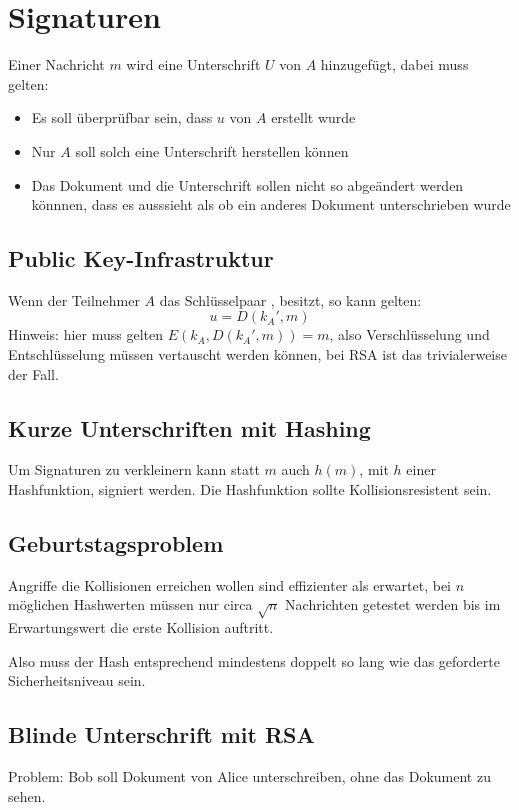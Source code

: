 \chapter{Signaturen}
Einer Nachricht $m$ wird eine Unterschrift $U$ von $A$ hinzugefügt, dabei muss gelten:
\begin{itemize}
    \item
        Es soll überprüfbar sein, dass $u$ von $A$ erstellt wurde
    \item
        Nur $A$ soll solch eine Unterschrift herstellen können
    \item
        Das Dokument und die Unterschrift sollen nicht so abgeändert werden könnnen,
        dass es ausssieht als ob ein anderes Dokument unterschrieben wurde
\end{itemize}

\section{Public Key-Infrastruktur}
Wenn der Teilnehmer $A$ das Schlüsselpaar ,  besitzt, so kann
gelten:
\begin{equation}
    u = D(k_A', m)
\end{equation}
Hinweis: hier muss gelten $E(k_A, D(k_A', m)) = m$, also Verschlüsselung und 
Entschlüsselung müssen vertauscht werden können, bei RSA ist das trivialerweise der
Fall.

\section{Kurze Unterschriften mit Hashing}
Um Signaturen zu verkleinern kann statt $m$ auch $h(m)$, mit $h$ einer Hashfunktion,
signiert werden. Die Hashfunktion sollte Kollisionsresistent sein.

\section{Geburtstagsproblem}
Angriffe die Kollisionen erreichen wollen sind effizienter als erwartet, bei $n$ möglichen
Hashwerten müssen nur circa $\sqrt{n}$ Nachrichten getestet werden bis im Erwartungswert
die erste Kollision auftritt.

Also muss der Hash entsprechend mindestens doppelt so lang wie das geforderte 
Sicherheitsniveau sein.

\section{Blinde Unterschrift mit RSA}
Problem: Bob soll Dokument von Alice unterschreiben, ohne das Dokument zu sehen.

